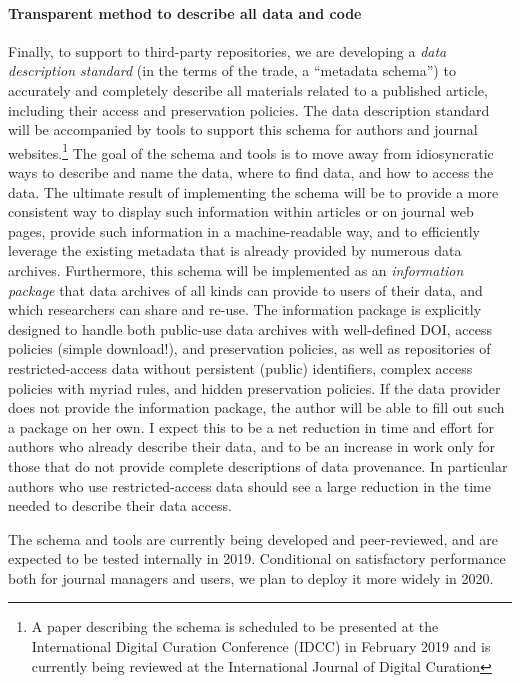 \documentclass[AEJ]{AEA}
\begin{document}
\paragraph{Transparent method to describe all data and code} Finally, to  support to third-party repositories, we are developing a \textit{data description standard} (in the terms of the trade, a ``metadata schema'') to accurately and completely describe all materials related to a published article, including their access and preservation policies. The data description standard will be accompanied by  tools to support this schema for authors and journal websites.\footnote{A paper describing the schema is scheduled to be presented at the International Digital Curation Conference (IDCC) in February 2019 and is currently being reviewed at the International Journal of Digital Curation} 
The goal of the schema and tools is to move away from idiosyncratic ways to describe and name the data, where to find data, and how to access the data. The ultimate result of implementing the schema will be to provide a more consistent way to display such information within articles or on journal web pages, provide such information in a machine-readable way, and to efficiently leverage the existing metadata that is already provided by numerous data archives. Furthermore, this schema will be implemented as an \textit{information package} that data archives of all kinds can provide to users of their data, and which researchers can share and re-use. The information package is explicitly designed to handle both public-use data archives with well-defined \ac{DOI}, access policies (simple download!), and preservation policies, as well as repositories of restricted-access data without persistent (public) identifiers, complex access policies with myriad rules, and hidden preservation policies. If the data provider does not provide the information package, the author will be able to fill out such a package on her own. I expect this to be a net reduction in time and effort for authors who already describe their data, and to be an increase in work only for those that do not provide complete descriptions of data provenance. In particular authors who use restricted-access data should see a large reduction in the time needed to describe their data access. 

The schema and tools are currently being developed and peer-reviewed, and are expected to be tested  internally in 2019. Conditional on satisfactory performance both for journal managers and users, we plan to deploy it more widely in 2020. 
\end{document}
